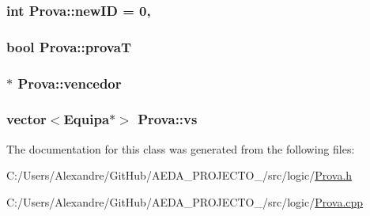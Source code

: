 \subsubsection[{new\+I\+D}]{\setlength{\rightskip}{0pt plus 5cm}int Prova\+::new\+I\+D = 0\hspace{0.3cm}{\ttfamily [static]}, {\ttfamily [private]}}\label{class_prova_aeaa338e40106c1be53f3f1134d3fb942}
\hypertarget{class_prova_a9b551ecafa591456d49345ceb9ea790d}{}
\subsubsection[{prova\+T}]{\setlength{\rightskip}{0pt plus 5cm}bool Prova\+::prova\+T\hspace{0.3cm}{\ttfamily [private]}}\label{class_prova_a9b551ecafa591456d49345ceb9ea790d}
\hypertarget{class_prova_a9da09789da7cc0ef43b38197c96558fc}{}
\subsubsection[{vencedor}]{$\ast$ Prova\+::vencedor\hspace{0.3cm}{\ttfamily [private]}}\label{class_prova_a9da09789da7cc0ef43b38197c96558fc}
\hypertarget{class_prova_aa085e9c4905e762142b6b735f4dfda30}{}
\subsubsection[{vs}]{\setlength{\rightskip}{0pt plus 5cm}vector$<${\bf Equipa}$\ast$$>$ Prova\+::vs\hspace{0.3cm}{\ttfamily [private]}}\label{class_prova_aa085e9c4905e762142b6b735f4dfda30}


The documentation for this class was generated from the following files\+:\begin{DoxyCompactItemize}
\item 
C\+:/\+Users/\+Alexandre/\+Git\+Hub/\+A\+E\+D\+A\+\_\+\+P\+R\+O\+J\+E\+C\+T\+O\+\_/src/logic/\hyperlink{_prova_8h}{Prova.\+h}\item 
C\+:/\+Users/\+Alexandre/\+Git\+Hub/\+A\+E\+D\+A\+\_\+\+P\+R\+O\+J\+E\+C\+T\+O\+\_/src/logic/\hyperlink{_prova_8cpp}{Prova.\+cpp}\end{DoxyCompactItemize}
